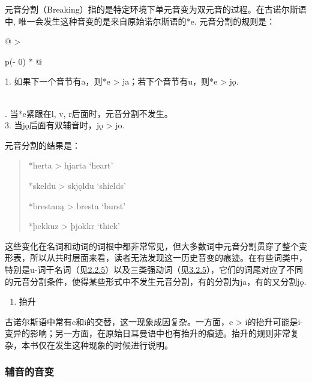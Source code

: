 元音分割（Breaking）指的是特定环境下单元音变为双元音的过程。在古诺尔斯语中,
唯一会发生这种音变的是来自原始诺尔斯语的*e. 元音分割的规则是：

\begin{longtable}[]{@{}
  >{\raggedright\arraybackslash}p{(\columnwidth - 0\tabcolsep) * }@{}}
\toprule\noalign{}
\begin{minipage}[b]{\linewidth}\raggedright
1. 如果下一个音节有a，则*e \textgreater{} ja；若下个音节有u，则*e
\textgreater{} jǫ.
\end{minipage} \\
\midrule\noalign{}
\endhead
\bottomrule\noalign{}
. 当*e紧跟在l, v, r后面时，元音分割不发生。 \\
3. 当jǫ后面有双辅音时，jǫ \textgreater{} jo. \\
\end{longtable}

元音分割的结果是：

\begin{quote}
*herta \textgreater{} hjarta `heart'

*skeldu \textgreater{} skjǫldu `shields'

*brestaną \textgreater{} bresta `burst'

*þekkuz \textgreater{} þjokkr `thick'
\end{quote}

这些变化在名词和动词的词根中都非常常见，但大多数词中元音分割贯穿了整个变形表，所以从共时层面来看，读者无法发现这一历史音变的痕迹。在有些词类中，特别是u-词干名词（见\hyperref[u-ux8bcdux5e72]{2.2.5}）以及三类强动词（见\hyperref[ux7b2cux4e09ux5f3aux53d8ux4f4dux6cd5]{3.2.5}），它们的词尾对应了不同的元音分割条件，使得某些形式中不发生元音分割，有的分割为ja，有的又分割jǫ.

\begin{enumerate}
\def\labelenumi{\Alph{enumi}.}
\setcounter{enumi}{4}
\item
  抬升
\end{enumerate}

古诺尔斯语中常有e和i的交替，这一现象成因复杂。一方面，e \textgreater{}
i的抬升可能是i-变异的影响；另一方面，在原始日耳曼语中也有抬升的痕迹。抬升的规则非常复杂，本书仅在发生这种现象的时候进行说明。

\subsubsection{辅音的音变}\label{ux8f85ux97f3ux7684ux97f3ux53d8}


